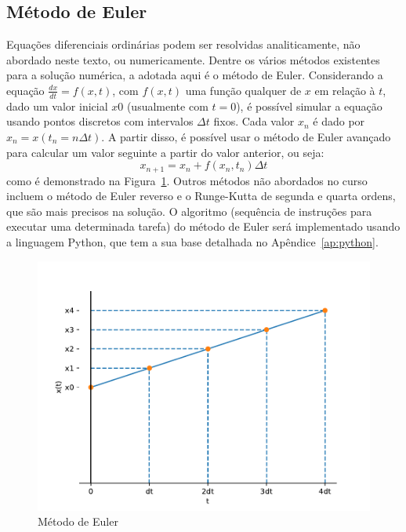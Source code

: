 \subsection{Método de Euler}
Equações diferenciais ordinárias podem ser resolvidas analiticamente, não abordado neste texto, ou numericamente. Dentre os vários métodos existentes para a solução numérica, a adotada aqui é o método de Euler. Considerando a equação $\frac{dx}{dt}=f(x,t)$, com $f(x,t)$ uma função qualquer de $x$ em relação à $t$, dado um valor inicial $x0$ (usualmente com $t=0$), é possível simular a equação usando pontos discretos com intervalos $\Delta t$ fixos. Cada valor $x_n$ é dado por $x_n=x(t_n=n\Delta t)$. A partir disso, é possível usar o método de Euler avançado para calcular um valor seguinte a partir do valor anterior, ou seja:
$$
x_{n+1}=x_n+f(x_n,t_n)\Delta t
$$
como é demonstrado na Figura~\ref{fig:euler}. Outros métodos não abordados no curso incluem o método de Euler reverso e o Runge-Kutta de segunda e quarta ordens, que são mais precisos na solução. O algoritmo (sequência de instruções para executar uma determinada tarefa) do método de Euler será implementado usando a linguagem Python, que tem a sua base detalhada no Apêndice~\ref{ap:python}.
\begin{figure}[tb]
	\centering
	\caption{Método de Euler}
	\label{fig:euler}
	\includegraphics[width=0.7\linewidth]{figs/euler}
\end{figure}
